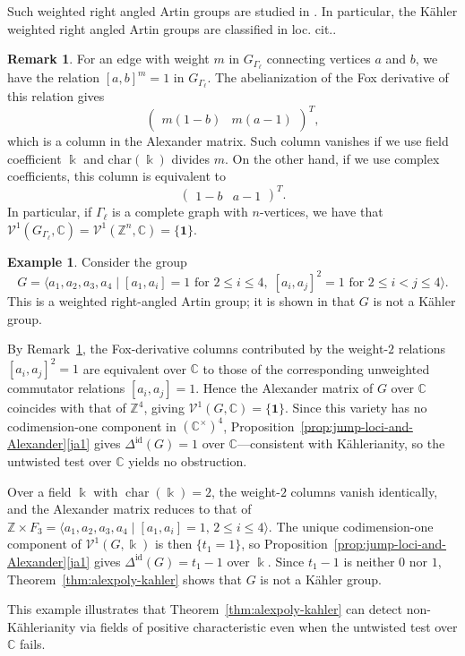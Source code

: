\documentclass[11pt]{amsart}
\theoremstyle{definition}
\newtheorem{example}[theorem]{Example}
\newtheorem{remark}[theorem]{Remark}
\newcommand{\Z}{\mathbb{Z}}
\newcommand{\C}{\mathbb{C}}
\newcommand{\bo}{\mathbf{1}}
\renewcommand{\k}{\Bbbk}
\newcommand{\VV}{\mathcal{V}}
\DeclareMathOperator{\id}{id}
\DeclareMathOperator{\ch}{char}
\begin{document}
Such weighted right angled Artin groups are studied in \cite{LL}. In particular, 
the K\"ahler  weighted right angled Artin groups are classified in loc. cit..
\begin{remark}
\label{rem:WRAAG}
For an edge  with weight $m$ in $G_{\Gamma_\ell}$ connecting vertices 
$a$ and $b$, we have the relation $[a,b]^m=1$ in $G_{\Gamma_\ell}$. 
The abelianization of the Fox derivative of this relation gives 
\[
\begin{pmatrix}
  m(1-b)  & m(a-1) 
\end{pmatrix}^T,
\]
 which is  a column in the Alexander matrix. Such column vanishes if we 
 use field coefficient $\k$ and $\mathrm{char}(\k)$ divides $m$. 
 On the other hand, if we use complex coefficients, this column 
 is equivalent to
 \[
 \begin{pmatrix}
  1-b  & a-1 
\end{pmatrix}^T.
\]
In particular, if $\Gamma_\ell $ is a complete graph with $n$-vertices, 
we have that $\VV^1(G_{\Gamma_\ell},\C)=\VV^1(\Z^n,\C)=\{\bo\}$. 
\end{remark}

\begin{example}
\label{ex:weighted-artin}
Consider the group
\[
G= \langle a_1,a_2,a_3,a_4 \mid [a_1,a_i]=1 \text{ for } 2\leq i\leq 4,\;
[a_i,a_j]^2=1 \text{ for } 2\leq i<j\leq 4 \rangle.
\]
This is a weighted right-angled Artin group; it is shown in \cite{LL} that $G$
is not a K\"{a}hler group.

By Remark~\ref{rem:WRAAG}, the Fox-derivative columns contributed
by the weight-$2$ relations $[a_i,a_j]^2=1$ are equivalent over $\C$
to those of the corresponding unweighted commutator relations $[a_i,a_j]=1$.
Hence the Alexander matrix of $G$ over $\C$ coincides with that of
$\Z^4$, giving $\VV^1(G,\C)=\{\bo\}$. Since this variety has no
codimension-one component in $(\C^{\times})^4$, 
Proposition~\ref{prop:jump-loci-and-Alexander}\eqref{ja1} 
gives $\Delta^{\id}(G)=1$ over $\C$---consistent
with K\"{a}hlerianity, so the untwisted test over $\C$ yields no obstruction.

Over a field $\k$ with $\ch(\k)=2$, the weight-$2$ columns vanish
identically, and the Alexander matrix reduces to that of
$\Z \times F_3 = \langle a_1,a_2,a_3,a_4 \mid [a_1,a_i]=1,\, 2\le i\le 4\rangle$.
The unique codimension-one component of $\VV^1(G,\k)$ is then $\{t_1=1\}$,
so Proposition~\ref{prop:jump-loci-and-Alexander}\eqref{ja1} gives
$\Delta^{\id}(G)=t_1-1$ over $\k$. Since $t_1-1$ is neither $0$ nor $1$,
Theorem~\ref{thm:alexpoly-kahler} shows that $G$ is not a K\"{a}hler group.

This example illustrates that Theorem~\ref{thm:alexpoly-kahler} can
detect non-K\"{a}hlerianity via fields of positive characteristic even when
the untwisted test over $\C$ fails.
\end{example}
\end{document}
